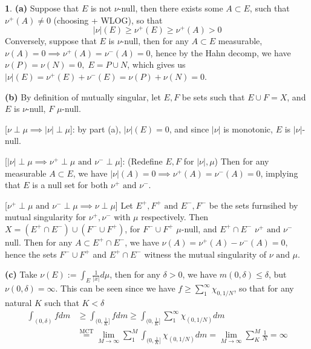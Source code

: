 \documentclass[10.5pt]{article}
\theoremstyle{definition}
\newtheorem{pb}{}
\newcommand{\abs}[1]{\left\vert#1\right\vert}
\newcommand{\tand}{\text{ and }}
\begin{document}
    \begin{pb}
        \textbf{(a)} Suppose that \(E\) is not \(\nu\)-null, then there exists some \(A \subset E\), such that \(\nu^+(A) \neq 0\) (choosing + WLOG), so that
        \[\abs{\nu}(E) \geq \nu^+(E) \geq \nu^+(A) > 0\]
        Conversely, suppose that \(E\) is \(\nu\)-null, then for any \(A \subset E\) measurable, \(\nu(A) = 0 \implies \nu^+(A) = \nu^-(A) = 0\), hence by the Hahn decomp, we have
        \(\nu(P) = \nu(N) = 0, \; E = P \cup N\), which gives us \(\abs{\nu}(E) = \nu^+(E) + \nu^-(E)= \nu(P) + \nu(N) = 0\).

        \textbf{(b)} By definition of mutually singular, let \(E,F\) be sets such that \(E \cup F = X\), and \(E\) is \(\nu\)-null,
        \(F\) \(\mu\)-null.

        [\(\nu \perp \mu \implies \abs{\nu}\perp\mu\)]: by part (a), \(\abs{\nu}(E) = 0\), and since \(\abs{\nu}\) is monotonic, \(E\) is \(\abs{\nu}\)-null.

        [\(\abs{\nu} \perp \mu \implies \nu^+ \perp \mu \tand \nu^- \perp \mu\)]: (Redefine \(E,F\) for \(\abs{\nu},\mu\)) Then for any measurable \(A \subset E\), we have
        \(\abs{\nu}(A) = 0 \implies \nu^+(A) = \nu^-(A) = 0\), implying that \(E\) is a null set for both \(\nu^+ \tand \nu^-\).

        [\(\nu^+ \perp \mu \tand \nu^- \perp \mu \implies \nu \perp \mu\)] Let \(E^+,F^+ \tand E^-,F^-\) be the sets furnsihed by mutual singularity for \(\nu^+,\nu^-\) with \(\mu\) respectively.
        Then \(X = (E^+ \cap E^-) \cup (F^- \cup F^+)\), for \(F^- \cup F^+\) \(\mu\)-null, and \(E^+ \cap E^-\) \(\nu^+ \tand \nu^-\) null. Then for any \(A \subset E^+ \cap E^-\), we have
        \(\nu(A) = \nu^+(A) - \nu^-(A) = 0\), hence the sets \(F^- \cup F^+\) and \(E^+ \cap E^-\) witness the mutual singularity of \(\nu \tand \mu\).

        \textbf{(c)} Take \(\nu(E) := \int_E \frac{1}{\abs{x}}d\mu\), then for any \(\delta > 0\), we have \(m(0,\delta) \leq \delta\), but \(\nu(0,\delta) = \infty\). This can be seen since
        we have \(f \geq \sum_1^\infty \chi_{0,1/N}\), so that for any natural \(K\) such that \(K < \delta\)
        \begin{align*}
            \int_{(0,\delta)} f dm &\geq \int_{(0,\frac{1}{K}]} f dm \geq \int_{(0,\frac{1}{K}]} \sum_1^\infty \chi_{(0,1/N)} dm \\
            &\overset{\text{MCT}}{=} \lim_{M\to\infty}\sum_1^M \int_{(0,\frac{1}{K}]} \chi_{(0,1/N)} dm = \lim_{M\to\infty} \sum_K^M \frac{1}{N} = \infty
        \end{align*}
    \end{pb}
\end{document}
